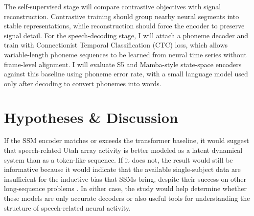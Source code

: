 \documentclass[twocolumn,letterpaper,10pt]{article}
\begin{document}
The self-supervised stage will compare contrastive objectives with signal reconstruction. Contrastive training should group nearby neural segments into stable representations, while reconstruction should force the encoder to preserve signal detail. For the speech-decoding stage, I will attach a phoneme decoder and train with Connectionist Temporal Classification (CTC) loss, which allows variable-length phoneme sequences to be learned from neural time series without frame-level alignment. I will evaluate S5 and Mamba-style state-space encoders against this baseline using phoneme error rate, with a small language model used only after decoding to convert phonemes into words. 

\section{Hypotheses \& Discussion}

If the SSM encoder matches or exceeds the transformer baseline, it would suggest that speech-related Utah array activity is better modeled as a latent dynamical system than as a token-like sequence. If it does not, the result would still be informative because it would indicate that the available single-subject data are insufficient for the inductive bias that SSMs bring, despite their success on other long-sequence problems \citep{mamba2023}. In either case, the study would help determine whether these models are only accurate decoders or also useful tools for understanding the structure of speech-related neural activity.






\end{document}
